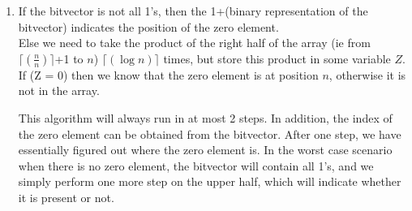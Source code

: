 \documentclass{article}[12pt]
\begin{document}
\begin{enumerate}
\item If the bitvector is not all 1's, then the 1+(binary representation of the bitvector) indicates the position of the zero element. \\
Else we need to take the product of the right half of the array (ie from $\lceil(\frac{n}{n})\rceil$+1 to $n$) $\lceil(\log n)\rceil$ times, but store this product in some variable $Z$. If (Z = 0) then we know that the zero element is at position $n$, otherwise it is not in the array.

  This algorithm will always run in at most 2 steps. In addition, the index of the zero element can be obtained from the bitvector. After one step, we have essentially figured out where the zero element is. In the worst case scenario when there is no zero element, the bitvector will contain all 1's, and we simply perform one more step on the upper half, which will indicate whether it is present or not. \\

\end{enumerate}
\end{document}
